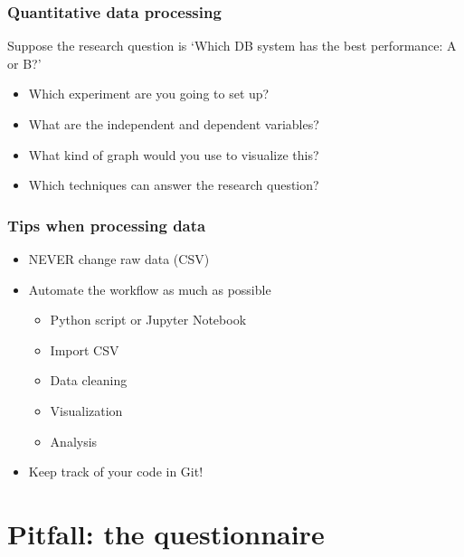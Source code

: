 \documentclass[aspectratio=169]{beamer}
\begin{document}
\begin{frame}
  \frametitle{Quantitative data processing}

  Suppose the research question is `Which DB system has the best performance: A or B?'

  \begin{itemize}
    \item<+-> Which experiment are you going to set up?
    \item<+-> What are the independent and dependent variables?
    \item<+-> What kind of graph would you use to visualize this?
    \item<+-> Which techniques can answer the research question?
  \end{itemize}


\end{frame}

\begin{frame}
  \frametitle{Tips when processing data}
  \begin{itemize}
    \item NEVER change raw data (CSV)
    \item Automate the workflow as much as possible
          \begin{itemize}
            \item Python script or Jupyter Notebook
            \item Import CSV
            \item Data cleaning
            \item Visualization
            \item Analysis
          \end{itemize}
    \item Keep track of your code in Git!
  \end{itemize}


\end{frame}

\section{Pitfall: the questionnaire}
\end{document}
